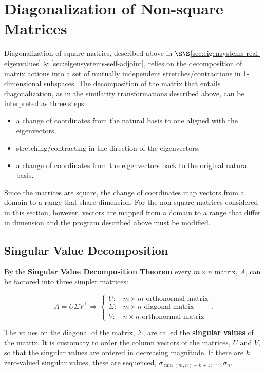 \documentclass[12pt, twoside, draft]{article}
\begin{document}
\section{Diagonalization of Non-square Matrices}\label{sec:diagonalization-non-square-matrices}
Diagonalization of square matrics, described above in $\S\S$\ref{sec:eigensystems-real-eigenvalues} \& \ref{sec:eigensystems-self-adjoint}, relies on the decomposition of matrix actions into a set of mutually independent stretches/contractions in 1-dimensional subspaces.  The decomposition of the matrix that entails diagonalization, as in the similarity transformations described above, can be interpreted as three steps:
\begin{itemize}[noitemsep]
\item a change of coordinates from the natural basis to one aligned with the eigenvectors,
\item stretching/contracting in the direction of the eigenvectors,
\item a change of coordinates from the eigenvectors back to the original natural basis.
\end{itemize}
Since the matrices are square, the change of coordinates map vectors from a domain to a range that share dimension.  For the non-square matrices considered in this section, however, vectors are mapped from a domain to a range that differ in dimension and the program described above must be modified.

\subsection{Singular Value Decomposition}\label{sec:singular-value-decomposition}
By the \textbf{Singular Value Decomposition Theorem} every $m \times n$ matrix, $A$, can be factored into three simpler matrices:

\begin{equation}\label{eq:singular_value_decomposition}
A = U \Sigma V^\top \Rightarrow 
\begin{cases}
U: & m \times m \text{ orthonormal matrix} \\  
\Sigma: & m \times n \text{ diagonal matrix} \\
V: & n \times n \text{ orthonormal matrix} 
\end{cases} .
\end{equation}

The values on the diagonal of the matrix, $\Sigma$, are called the \textbf{singular values} of the matrix.  It is customary to order the column vectors of the matrices, $U$ and $V$, so that the singular values are ordered in decreasing magnitude.  If there are $k$ zero-valued singular values, these are sequenced, $\sigma_{\min(m,n)-k+1}, \ldots, \sigma_{n}$.
\end{document}
